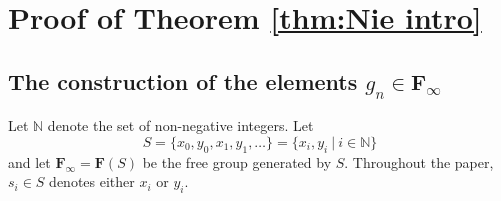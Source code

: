 \documentclass[12pt,reqno,a4paper]{article}
\theoremstyle{definition}
\theoremstyle{remark}
\numberwithin{equation}{section}
\numberwithin{figure}{section}
\newcommand{\B}[1]{{\mathbf #1}}
\begin{document}
\section{Proof of Theorem \ref{thm:Nie intro}}\label{S:Finfty}


\subsection{The construction of the elements  $g_n \in \B F_{\infty}$}\label{SS:construction}
Let $\mathbb N$ denote the set of non-negative integers.
Let 
$$
S = \{x_0,y_0,x_1,y_1,\ldots\} = \{x_i,y_i\ |\ i\in \mathbb N\}
$$
and let $\B F_{\infty} = \B F(S)$ be the free group generated by $S$.
Throughout the paper, $s_i\in S$ denotes either $x_i$ or $y_i$.
\end{document}
